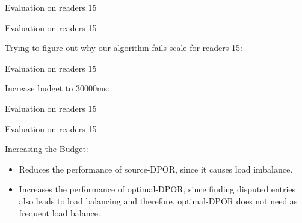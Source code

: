 \begin{frame}{Evaluation on readers 15}


\end{frame}


\begin{frame}{Evaluation on readers 15}

Trying to figure out why our algorithm fails scale for readers 15:


\end{frame}


\begin{frame}{Evaluation on readers 15}

Increase budget to 30000ms:


\end{frame}

\begin{frame}{Evaluation on readers 15}



\end{frame}


\begin{frame}{Evaluation on readers 15}

Increasing the Budget:

\begin{itemize}
\item Reduces the performance of source-DPOR, since it causes load imbalance.
\item Increases the performance of optimal-DPOR, since finding disputed entries also leads to load balancing and therefore,
optimal-DPOR does not need as frequent load balance.
\end{itemize}

\end{frame}

\iffalse
\begin{frame}{Evaluation on rush hour}


\tracelong{../img/rushhour.png}{Input of rush hour}


\end{frame}
\fi

